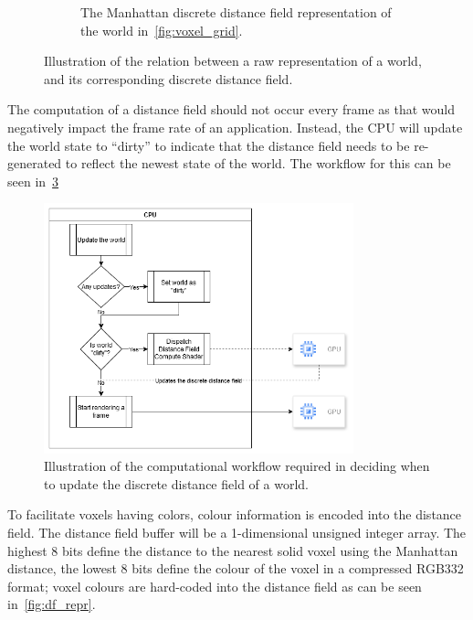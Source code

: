 \begin{figure}[htbp]
\begin{subfigure}{0.49\textwidth}
        \caption{The Manhattan discrete distance field representation of the world in~\ref{fig:voxel_grid}.}
        \label{fig:voxel_grid_df}
    \end{subfigure}
    \caption{Illustration of the relation between a raw representation of a world, and its corresponding discrete
        distance field.}
\end{figure}

The computation of a distance field should not occur every frame as that would negatively impact the frame rate of an
application. Instead, the CPU will update the world state to ``dirty'' to indicate that the distance field needs to be
re-generated to reflect the newest state of the world. The workflow for this can be seen in~\ref{fig:df_update_proc}

\begin{figure}[htbp]
    \centering
    \includegraphics[width=0.8\textwidth]{figures/df_update_proc.drawio.png}
    \caption{Illustration of the computational workflow required in deciding when to update the discrete distance field
        of a world.}
    \label{fig:df_update_proc}
\end{figure}

To facilitate voxels having colors, colour information is encoded into the distance field. The distance field buffer
will be a 1-dimensional unsigned integer array. The highest 8 bits define the distance to the nearest solid voxel using
the Manhattan distance, the lowest 8 bits define the colour of the voxel in a compressed RGB332 format; voxel colours
are hard-coded into the distance field as can be seen in~\ref{fig:df_repr}.

